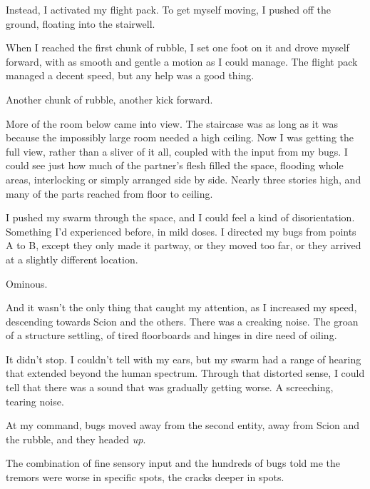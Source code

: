 Instead, I activated my flight pack.  To get myself moving, I pushed off the ground, floating into the stairwell.



When I reached the first chunk of rubble, I set one foot on it and drove myself forward, with as smooth and gentle a motion as I could manage.  The flight pack managed a decent speed, but any help was a good thing.



Another chunk of rubble, another kick forward.



More of the room below came into view.  The staircase was as long as it was because the impossibly large room needed a high ceiling.  Now I was getting the full view, rather than a sliver of it all, coupled with the input from my bugs.  I could see just how much of the partner's flesh filled the space, flooding whole areas, interlocking or simply arranged side by side.  Nearly three stories high, and many of the parts reached from floor to ceiling.



I pushed my swarm through the space, and I could feel a kind of disorientation.  Something I'd experienced before, in mild doses.  I directed my bugs from points A to B, except they only made it partway, or they moved too far, or they arrived at a slightly different location.



Ominous.



And it wasn't the only thing that caught my attention, as I increased my speed, descending towards Scion and the others.  There was a creaking noise.  The groan of a structure settling, of tired floorboards and hinges in dire need of oiling.



It didn't stop.  I couldn't tell with my ears, but my swarm had a range of hearing that extended beyond the human spectrum.  Through that distorted sense, I could tell that there was a sound that was gradually getting worse.  A screeching, tearing noise.



At my command, bugs moved away from the second entity, away from Scion and the rubble, and they headed \emph{up}.



The combination of fine sensory input and the hundreds of bugs told me the tremors were worse in specific spots, the cracks deeper in spots.



